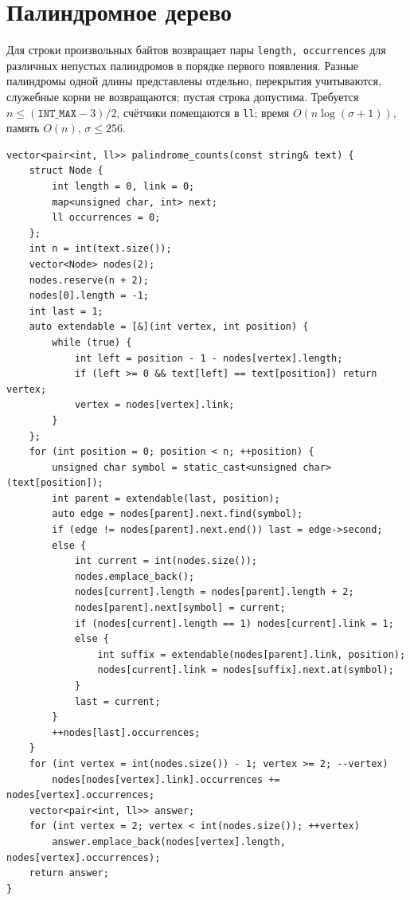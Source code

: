 %

\iffalse
\section{Палиндромное дерево}
Для строки произвольных байтов возвращает пары \texttt{length, occurrences} для различных непустых палиндромов в порядке первого появления.
Разные палиндромы одной длины представлены отдельно, перекрытия учитываются, служебные корни не возвращаются; пустая строка допустима.
Требуется $n\le(\texttt{INT\_MAX}-3)/2$, счётчики помещаются в \texttt{ll}; время $O(n\log(\sigma+1))$, память $O(n)$, $\sigma\le256$.
\begin{lstlisting}[name=extra_string_palindromic_tree]
vector<pair<int, ll>> palindrome_counts(const string& text) {
    struct Node {
        int length = 0, link = 0;
        map<unsigned char, int> next;
        ll occurrences = 0;
    };
    int n = int(text.size());
    vector<Node> nodes(2);
    nodes.reserve(n + 2);
    nodes[0].length = -1;
    int last = 1;
    auto extendable = [&](int vertex, int position) {
        while (true) {
            int left = position - 1 - nodes[vertex].length;
            if (left >= 0 && text[left] == text[position]) return vertex;
            vertex = nodes[vertex].link;
        }
    };
    for (int position = 0; position < n; ++position) {
        unsigned char symbol = static_cast<unsigned char>(text[position]);
        int parent = extendable(last, position);
        auto edge = nodes[parent].next.find(symbol);
        if (edge != nodes[parent].next.end()) last = edge->second;
        else {
            int current = int(nodes.size());
            nodes.emplace_back();
            nodes[current].length = nodes[parent].length + 2;
            nodes[parent].next[symbol] = current;
            if (nodes[current].length == 1) nodes[current].link = 1;
            else {
                int suffix = extendable(nodes[parent].link, position);
                nodes[current].link = nodes[suffix].next.at(symbol);
            }
            last = current;
        }
        ++nodes[last].occurrences;
    }
    for (int vertex = int(nodes.size()) - 1; vertex >= 2; --vertex)
        nodes[nodes[vertex].link].occurrences += nodes[vertex].occurrences;
    vector<pair<int, ll>> answer;
    for (int vertex = 2; vertex < int(nodes.size()); ++vertex)
        answer.emplace_back(nodes[vertex].length, nodes[vertex].occurrences);
    return answer;
}
\end{lstlisting}
